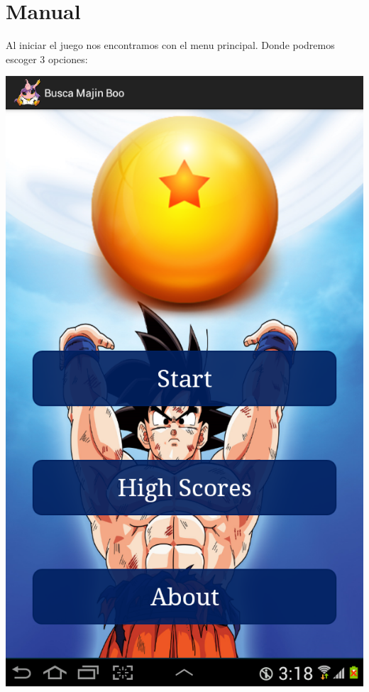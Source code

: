 \documentclass[11pt]{article} %
\begin{document}
\section{Manual}
Al iniciar el juego nos encontramos con el menu principal. Donde podremos escoger 3 opciones:
\begin{center}
\includegraphics[scale=0.15]{Imagenes/SSMenuPrincipal.png}
\end{center}
\end{document}
